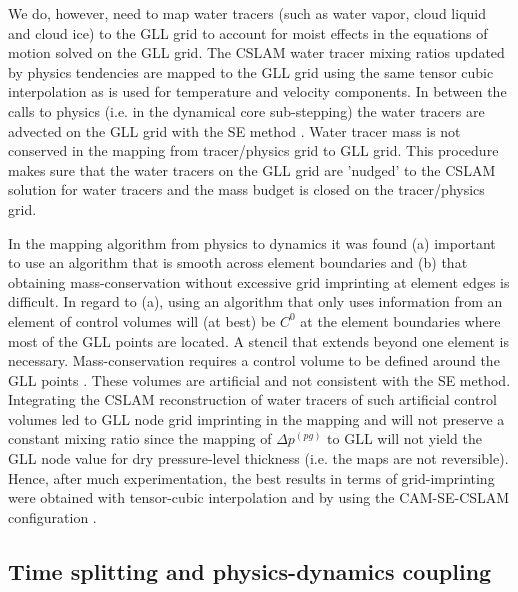 \documentclass[twocol]{ametsoc}
\begin{document}
We do, however, need to map water tracers (such as water vapor, cloud liquid and cloud ice) to the GLL grid to account for moist effects in the equations of motion solved on the GLL grid. The CSLAM water tracer mixing ratios updated by physics tendencies are mapped to the GLL grid using the same tensor cubic interpolation as is used for temperature and velocity components. In between the calls to physics (i.e. in the dynamical core sub-stepping) the water tracers are advected on the GLL grid with the SE method \citep[see section 3.5 in ][]{LetAl2018JAMES}. Water tracer mass is not conserved in the mapping from tracer/physics grid to GLL grid. This procedure makes sure that the water tracers on the GLL grid are 'nudged' to the CSLAM solution for water tracers and the mass budget is closed on the tracer/physics grid.

In the mapping algorithm from physics to dynamics it was found (a) important to use an algorithm that is smooth across element boundaries and (b) that obtaining mass-conservation without excessive grid imprinting at element edges is difficult. In regard to (a), using an algorithm that only uses information from an element of control volumes will (at best) be $C^0$ at the element boundaries where most of the GLL points are located. A stencil that extends beyond one element is necessary. Mass-conservation requires a control volume to be defined around the GLL points \cite[see, .e.g., Figure \ref{fig:cv-grids} in this paper or Figure 8b in ][]{UDJ2016MWR}. These volumes are artificial and not consistent with the SE method. Integrating the CSLAM reconstruction of water tracers of such artificial control volumes led to GLL node grid imprinting in the mapping and will not preserve a constant mixing ratio since the mapping of $\Delta p^{(pg)}$ to GLL will not yield the GLL node value for dry pressure-level thickness (i.e. the maps are not reversible). Hence, after much experimentation, the best results in terms of grid-imprinting were obtained with tensor-cubic interpolation and by using the CAM-SE-CSLAM configuration {\color{red}{(which requires the same boundary exchange/communication as used in CSLAM)}}.

\subsection{{\color{red}Time splitting and physics-dynamics coupling{}}}
\end{document}
